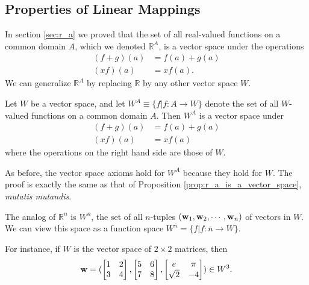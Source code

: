 \documentclass[12pt,letterpaper,reqno]{article}
\numberwithin{equation}{section}
\begin{document}
\subsection{Properties of Linear Mappings}
In section \ref{sec:r_a} we proved that the set of all real-valued functions on a common domain $A$, which we denoted $\mathbb{R}^A$, is a vector space under the operations 
	\begin{align*}
		(f+g)(a)&=f(a)+g(a) \\
		(xf)(a)&=xf(a).
	\end{align*}
We can generalize $\mathbb{R}^A$ by replacing $\mathbb{R}$ by any other vector space $W$. 

\begin{prop}
Let $W$ be a vector space, and let $W^A\equiv \{f|f:A \to W\}$ denote the set of all $W$-valued functions on a common domain $A$. Then $W^A$ is a vector space under
\begin{align*}
(f+g)(a)&=f(a)+g(a) \\
(xf)(a)&=xf(a)	
\end{align*}
where the operations on the right hand side are those of $W$.	
\end{prop}

\begin{pf}
 As before, the vector space axioms hold for $W^A$ because they hold for $W$. The proof is exactly the same as that of Proposition \ref{prop:r_a_is_a_vector_space}, \emph{mutatis mutandis}.	
\end{pf}


\begin{example}
The analog of $\mathbb{R}^n$ is $W^n$, the set of all $n$-tuples $({\bf w}_1, {\bf w}_2, \cdots, {\bf w}_n)$ of vectors in $W$. We can view this space as a function space $W^{\overline{n}}=\{f|f:\overline{n} \to W\}$. 

For instance, if $W$ is the vector space of $2 \times 2$ matrices, then
\begin{align*}
	{\bf w}=(\begin{bmatrix}
		1 & 2 \\ 3 & 4
	\end{bmatrix}, \begin{bmatrix}
		5 & 6 \\ 7 & 8
	\end{bmatrix}, \begin{bmatrix}
		e & \pi \\ \sqrt{2} & -4
	\end{bmatrix}) \in W^3.
\end{align*}	
\end{example}
\end{document}
